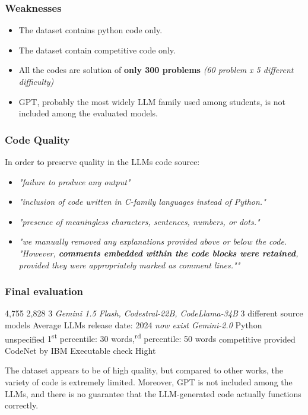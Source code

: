 \subsubsection*{Weaknesses}
\begin{itemize}
    \item The dataset contains python code only.
    \item The dataset contain competitive code only.
    \item All the codes are solution of \textbf{only 300 problems} 
    \textit{(60 problem x 5 different difficulty)}
    \item GPT, probably the most widely LLM family 
    used among students, is not 
    included among the evaluated models.
\end{itemize}


\subsubsection*{Code Quality}
In order to preserve quality in the LLMs code source:
\begin{itemize}
    \item \textit{"failure to produce any output"}
    \item \textit{"inclusion of code written in C-family languages instead of Python."}
    \item \textit{"presence of meaningless characters, sentences, numbers, or dots."}
    \item \textit{"we manually removed any explanations provided above or below the code.
    "However, \textbf{comments embedded within the code blocks were retained}, provided they were 
    appropriately marked as comment lines.""}
\end{itemize}


\subsubsection*{Final evaluation}


\expandafter\def\csname AIGCodeSetHumanCode\endcsname{4,755}
\expandafter\def\csname AIGCodeSetLLMCode\endcsname{2,828}
\expandafter\def\csname AIGCodeSetNumLLMs\endcsname{3 \textit{Gemini 1.5 Flash, Codestral-22B, CodeLlama-34B}}
\expandafter\def\csname AIGCodeSetLLMDiversity\endcsname{3 different source models}
\expandafter\def\csname AIGCodeSetCurrentUse\endcsname{Average LLMs release date: 2024 \textit{now exist Gemini-2.0}}
\expandafter\def\csname AIGCodeSetLanguages\endcsname{Python}
\expandafter\def\csname AIGCodeSetCodeTypes\endcsname{unspecified}
\expandafter\def\csname AIGCodeSetCodeSize\endcsname{1\textsuperscript{st} percentile: 30 words,\textsuperscript{rd} percentile: 50 words}
\expandafter\def\csname AIGCodeSetCodeContext\endcsname{competitive}
\expandafter\def\csname AIGCodeSetPrompts\endcsname{provided}
\expandafter\def\csname AIGCodeSetSources\endcsname{CodeNet by IBM \cite{puri2021codenet}}
\expandafter\def\csname AIGCodeSetCodeQuality\endcsname{Executable check}
\expandafter\def\csname AIGCodeSetReliability\endcsname{Hight}




The dataset appears to be of high quality, but compared to other works, 
the variety of code is extremely limited.
Moreover, GPT is not included among the LLMs, and there is no guarantee that 
the LLM-generated code actually functions correctly.